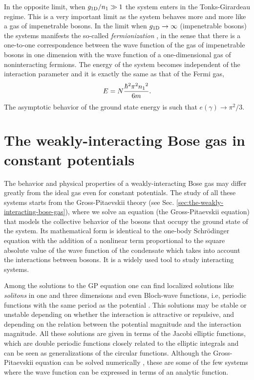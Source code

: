 In the opposite limit, when $g_{ \mathrm{1D} } / {{n}_1} \gg 1$ the system enters in
the Tonks-Girardeau regime. This is a very important limit as the system behaves
more and more like a gas of impenetrable bosons. In the limit when $g_{ \mathrm{1D} } \to
	\infty$ (impenetrable bosons) the systems manifests the so-called
\textit{fermionization} \cite{bib:girardeau-j-math-phys.1960}, in the sense that
there is a one-to-one correspondence between the wave function of the gas of
impenetrable bosons in one dimension with the wave function of a one-dimensional
gas of noninteracting fermions. The energy of the system becomes independent of
the interaction parameter and it is exactly the same as that of the Fermi gas,
%
\begin{equation}
	\label{eq:tonks-girardeau-energy}
	E = N \frac{\hbar^2 \pi^2 {{n}_1}^2 }{6m}.
\end{equation}
%
The asymptotic behavior of the ground state energy is such that $e(\gamma)
	\rightarrow \pi^2 / 3$.


\section{The weakly-interacting Bose gas in constant potentials}

The behavior and physical properties of a weakly-interacting Bose gas may differ
greatly from the ideal gas even for constant potentials. The study of all these
systems starts from the Gross-Pitaevskii theory (see Sec.
\ref{sec:the-weakly-interacting-bose-gas}), where we solve an equation (the
Gross-Pitaevskii equation) that models the collective behavior of the bosons
that occupy the ground state of the system. Its mathematical form is identical
to the one-body Schrödinger equation with the addition of a nonlinear term
proportional to the square absolute value of the wave function of the condensate
which takes into account the interactions between bosons. It is a widely used
tool to study interacting systems.

Among the solutions to the GP equation one can find localized solutions like
\textit{solitons} in one and three dimensions
\cite{bib:seaman-phys-rev-A.71.033609.2005,
	bib:wang-ying-ying-mod-phys-lett-B.27.12.2013} and even Bloch-wave functions,
i.e, periodic functions with the same period as the potential
\cite{bib:smerzi-phys-rev-E.70.016605.2004}. This solutions may be stable or
unstable depending on whether the interaction is attractive or repulsive, and
depending on the relation between the potential magnitude and the interaction
magnitude. All these solutions are given in terms of the Jacobi elliptic
functions\nocite{bib:abramowitz-stegun-1965}, which are double periodic
functions closely related to the elliptic integrals and can be seen as
generalizations of the circular functions. Although the Gross-Pitaevskii
equation can be solved numerically
\cite{bib:berg-molmer-phys-rev-A.58.1480.1998,
	bib:adhikari-j-of-phys-B.36.12.2003}, these are some of the few systems where
the wave function can be expressed in terms of an analytic function.

